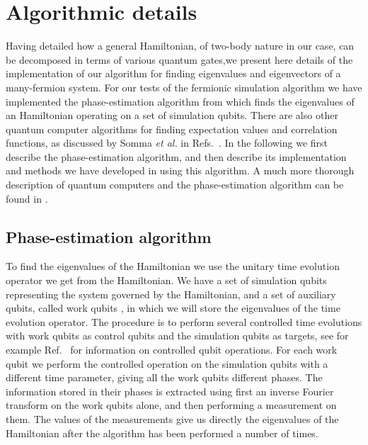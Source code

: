 \documentclass[aps,pra,twocolumn,floatfix]{revtex4}
\begin{document}
\section{Algorithmic details}
\label{sec:details}
Having detailed how a general Hamiltonian, of two-body nature in our case,
can be decomposed in terms of various quantum gates,we present here details of the 
implementation of our algorithm for finding eigenvalues and eigenvectors of
a many-fermion system.
For our tests of the fermionic simulation algorithm we have
implemented the phase-estimation algorithm from \cite{nielsen2000}
which finds the eigenvalues of an Hamiltonian operating on a set of
simulation qubits.  There are also other quantum computer algorithms for
finding expectation values and correlation functions, as discussed by Somma {\em et al.} in 
Refs.~\cite{somma2002,somma2005}. 
In the following we first describe the phase-estimation algorithm, and
then describe its implementation  and methods we have developed
in using this algorithm. A much more thorough description of quantum
computers and the phase-estimation algorithm can be found in
\cite{ovrum2003}. 


\subsection{Phase-estimation algorithm}

To find the eigenvalues of the Hamiltonian we use
the unitary time evolution operator we get from the Hamiltonian. 
We have a set of simulation qubits representing the system governed by
the Hamiltonian, and a set of auxiliary qubits, called work qubits \cite{lloyd1997,lloyd1999a}, in
which we will store the eigenvalues of the time evolution operator.
The procedure is to perform several controlled time evolutions with
work 
qubits as control qubits and the simulation qubits as targets,  
see for example Ref.~\cite{nielsen2000} for information on controlled qubit
operations. 
For
each work qubit we perform the controlled operation on the simulation
qubits with a different time parameter, giving all the work qubits
different phases. The information stored in their phases is extracted
using first an inverse Fourier transform on the work qubits alone, and
then performing a measurement on them. The values of the
measurements give us directly the eigenvalues of the Hamiltonian after
the algorithm has been performed a number of times.
\end{document}
